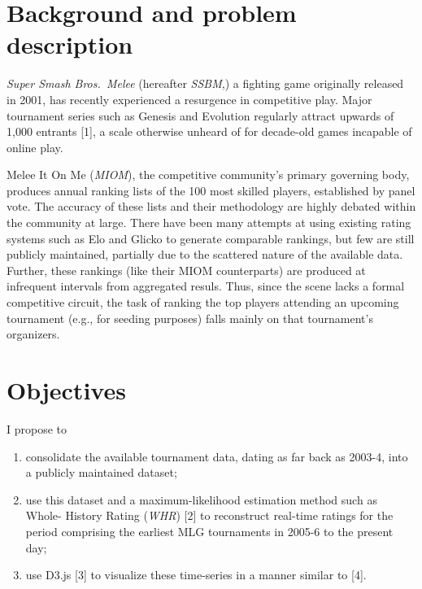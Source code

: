 \hypertarget{background-and-problem-description}{%
\section{Background and problem
description}\label{background-and-problem-description}}

\emph{Super Smash Bros.~Melee} (hereafter \emph{SSBM},) a fighting game
originally released in 2001, has recently experienced a resurgence in
competitive play. Major tournament series such as Genesis and Evolution
regularly attract upwards of 1,000 entrants {[}1{]}, a scale otherwise
unheard of for decade-old games incapable of online play.

Melee It On Me (\emph{MIOM}), the competitive community's primary
governing body, produces annual ranking lists of the 100 most skilled
players, established by panel vote. The accuracy of these lists and
their methodology are highly debated within the community at large.
There have been many attempts at using existing rating systems such as
Elo and Glicko to generate comparable rankings, but few are still
publicly maintained, partially due to the scattered nature of the
available data. Further, these rankings (like their MIOM counterparts)
are produced at infrequent intervals from aggregated resuls. Thus, since
the scene lacks a formal competitive circuit, the task of ranking the
top players attending an upcoming tournament (e.g., for seeding
purposes) falls mainly on that tournament's organizers.

\hypertarget{objectives}{%
\section{Objectives}\label{objectives}}

I propose to

\begin{enumerate}
\def\labelenumi{\roman{enumi}.}
\tightlist
\item
  consolidate the available tournament data, dating as far back as
  2003-4, into a publicly maintained dataset;
\item
  use this dataset and a maximum-likelihood estimation method such as
  Whole- History Rating (\emph{WHR}) {[}2{]} to reconstruct real-time
  ratings for the period comprising the earliest MLG tournaments in
  2005-6 to the present day;
\item
  use D3.js {[}3{]} to visualize these time-series in a manner similar
  to {[}4{]}.
\end{enumerate}

